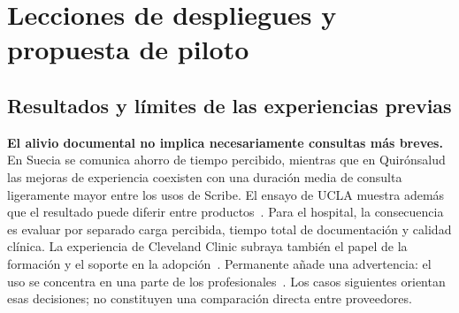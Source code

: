 \clearpage
\section{Lecciones de despliegues y propuesta de piloto}
\label{sec:piloto}
\subsection{Resultados y límites de las experiencias previas}
\textbf{El alivio documental no implica necesariamente consultas más breves.} En Suecia se comunica ahorro de tiempo percibido, mientras que en Quirónsalud las mejoras de experiencia coexisten con una duración media de consulta ligeramente mayor entre los usos de Scribe. El ensayo de UCLA muestra además que el resultado puede diferir entre productos~\cite{C7S8N9NA,U5GHQW86,PR93N8FN}. Para el hospital, la consecuencia es evaluar por separado carga percibida, tiempo total de documentación y calidad clínica. La experiencia de Cleveland Clinic subraya también el papel de la formación y el soporte en la adopción~\cite{F5FVUMMX}. Permanente añade una advertencia: el uso se concentra en una parte de los profesionales~\cite{tierney2025}. Los casos siguientes orientan esas decisiones; no constituyen una comparación directa entre proveedores.

